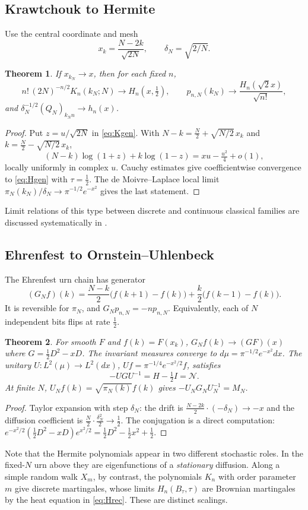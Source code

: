 \documentclass[11pt,reqno]{amsart}
\newtheorem{theorem}{Theorem}[section]
\theoremstyle{definition}
\theoremstyle{remark}
\newcommand{\NN}{\mathcal N}
\newcommand{\Id}{I}
\begin{document}
\subsection{Krawtchouk to Hermite}
Use the central coordinate and mesh
\begin{equation}\label{eq:scale}
x_k=\frac{N-2k}{\sqrt{2N}},\qquad\delta_N=\sqrt{2/N}.
\end{equation}
\begin{theorem}\label{thm:KH}
If $x_{k_N}\to x$, then for each fixed $n$,
\[
n!\,(2N)^{-n/2}K_n(k_N;N)\to H_n(x,\tfrac12),\qquad
p_{n,N}(k_N)\to\frac{H_n(\sqrt2x)}{\sqrt{n!}},
\]
and $\delta_N^{-1/2}(Q_N)_{k_Nn}\to h_n(x)$.
\end{theorem}
\begin{proof}
Put $z=u/\sqrt{2N}$ in \eqref{eq:Kgen}. With $N-k=\frac N2+\sqrt{N/2}\,x_k$
and $k=\frac N2-\sqrt{N/2}\,x_k$,
\[
(N-k)\log(1+z)+k\log(1-z)=xu-\tfrac{u^2}4+o(1),
\]
locally uniformly in complex $u$. Cauchy estimates give coefficientwise
convergence to \eqref{eq:Hgen} with $\tau=\frac12$. The de Moivre--Laplace
local limit $\pi_N(k_N)/\delta_N\to\pi^{-1/2}e^{-x^2}$ gives the last
statement.
\end{proof}
Limit relations of this type between discrete and continuous classical
families are discussed systematically in \cite{GodoyEtAl1998}.

\subsection{Ehrenfest to Ornstein--Uhlenbeck}
The Ehrenfest urn chain has generator
\begin{equation}\label{eq:GN}
(G_Nf)(k)=\frac{N-k}2\big(f(k+1)-f(k)\big)+\frac k2\big(f(k-1)-f(k)\big).
\end{equation}
It is reversible for $\pi_N$, and $G_Np_{n,N}=-np_{n,N}$. Equivalently,
each of $N$ independent bits flips at rate $\frac12$.
\begin{theorem}\label{thm:OU}
For smooth $F$ and $f(k)=F(x_k)$,
$G_Nf(k)\to(GF)(x)$ where $G=\frac12D^2-xD$. The invariant measures
converge to $d\mu=\pi^{-1/2}e^{-x^2}dx$. The unitary
$U:L^2(\mu)\to L^2(dx)$, $Uf=\pi^{-1/4}e^{-x^2/2}f$, satisfies
\[
-UGU^{-1}=H-\tfrac12\Id=\NN.
\]
At finite $N$, $U_Nf(k)=\sqrt{\pi_N(k)}f(k)$ gives $-U_NG_NU_N^{-1}=M_N$.
\end{theorem}
\begin{proof}
Taylor expansion with step $\delta_N$: the drift is
$\frac{N-2k}{2}\cdot(-\delta_N)\to-x$ and the diffusion coefficient is
$\frac N2\cdot\frac{\delta_N^2}{2}\to\frac12$. The conjugation is a
direct computation: $e^{-x^2/2}(\frac12D^2-xD)e^{x^2/2}=\frac12D^2-\frac12x^2+\frac12$.
\end{proof}
Note that the Hermite polynomials appear in two different stochastic
roles. In the fixed-$N$ urn above they are eigenfunctions of a
\emph{stationary} diffusion. Along a simple random walk $X_m$, by
contrast, the polynomials $K_n$ with order parameter $m$ give discrete
martingales, whose limits $H_n(B_\tau,\tau)$ are Brownian martingales by
the heat equation in \eqref{eq:Hrec}. These are distinct scalings.
\end{document}
